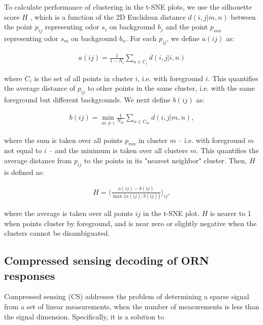 \documentclass[9pt,lineno]{elife}
\begin{document}
{\color{blue}
To calculate performance of clustering in the t-SNE plots, we use the silhouette score $H$ \citep{silhouette_score}, which is a function of the 2D Euclidean distance $d(i, j| m, n)$ between the point $p_{ij}$ representing odor $s_i$ on background $b_j$ and the point $p_{mn}$ representing odor $s_m$ on background $b_n$. For each $p_{ij}$, we define $a(ij)$ as:

\begin{align}
a(ij) = \frac{1}{1-N_i}\sum_{n \in C_i} d(i, j| i, n)
\end{align}

where $C_i$ is the set of all points in cluster $i$, i.e. with foreground $i$. This quantifies the average distance of $p_{ij}$ to other points in the same cluster, i.e. with the same foreground but different backgrounds. We next define $b(ij)$ as:

\begin{align}
b(ij) = \min_{m \ne i}
\frac{1}{N_m}\sum_{n \in C_m} d(i, j| m, n),
\end{align}

where the sum is taken over all points $p_{mn}$ in cluster $m$ -- i.e. with foreground $m$ not equal to $i$ -- and the minimum is taken over all clusters $m$. This quantifies the average distance from $p_{ij}$ to the points in its "nearest neighbor" cluster.
Then, $H$ is defined as:

\begin{align}
H = \langle \frac{a(ij) - b(ij)}{\max\{a(ij), b(ij)\}}
\rangle_{ij},
\end{align}

where the average is taken over all points $ij$ in the t-SNE plot. $H$ is nearer to 1 when points cluster by foreground, and is near zero or slightly negative when the clusters cannot be disambiguated. \\
}


\subsection{Compressed sensing decoding of ORN responses} 




Compressed sensing (CS) addresses the problem of determining a sparse signal from a set of linear measurements, when the number of measurements is less than the signal dimension. Specifically, it is a solution to 
\end{document}
